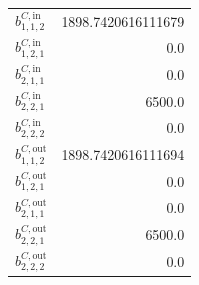 \documentclass{article}%
\begin{document}
\begin{multicols*}{3}
\begin{supertabular}{lr}
	$b_{1,1,2}^{C,\text{in}}$ & 1898.7420616111679 \\%
	$b_{1,2,1}^{C,\text{in}}$ & 0.0 \\%
	$b_{2,1,1}^{C,\text{in}}$ & 0.0 \\%
	$b_{2,2,1}^{C,\text{in}}$ & 6500.0 \\%
	$b_{2,2,2}^{C,\text{in}}$ & 0.0 \\%
	$b_{1,1,2}^{C,\text{out}}$ & 1898.7420616111694 \\%
	$b_{1,2,1}^{C,\text{out}}$ & 0.0 \\%
	$b_{2,1,1}^{C,\text{out}}$ & 0.0 \\%
	$b_{2,2,1}^{C,\text{out}}$ & 6500.0 \\%
	$b_{2,2,2}^{C,\text{out}}$ & 0.0 \\%
\end{supertabular}%
\end{multicols*}%
\end{document}
